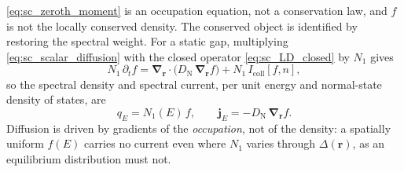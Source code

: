 \documentclass[
  aps,
  prb,
  preprint,
  superscriptaddress,
  longbibliography,
  nofootinbib
]{revtex4-2}
\newcommand{\br}{\mathbf{r}}
\newcommand{\bnabla}{\boldsymbol{\nabla}}
\newcommand{\DOS}{N_1}
\newcommand{\DN}{D_{\mathrm{N}}}
\newcommand{\Icoll}{I_{\mathrm{coll}}}
\begin{document}
\cref{eq:sc_zeroth_moment} is an occupation equation, not a
conservation law, and \(f\) is not the locally conserved density. The
conserved object is identified by restoring the spectral weight. For a
static gap, multiplying \cref{eq:sc_scalar_diffusion} with the closed
operator \cref{eq:sc_LD_closed} by \(\DOS\) gives
\begin{equation}
  \DOS\,\partial_t f
  =
  \bnabla_{\br}\cdot\bigl(\DN\,\bnabla_{\br}f\bigr)
  +
  \DOS\,\Icoll[f,n],
  \label{eq:cons_static}
\end{equation}
so the spectral density and spectral current, per unit energy and
normal-state density of states, are
\begin{equation}
  q_E=\DOS(E)\,f,
  \qquad
  \mathbf{j}_E=-\DN\,\bnabla_{\br}f .
  \label{eq:cons_density_current}
\end{equation}
Diffusion is driven by gradients of the \emph{occupation}, not of the
density: a spatially uniform \(f(E)\) carries no current even where
\(\DOS\) varies through \(\Delta(\br)\), as an equilibrium distribution
must not.
\end{document}
